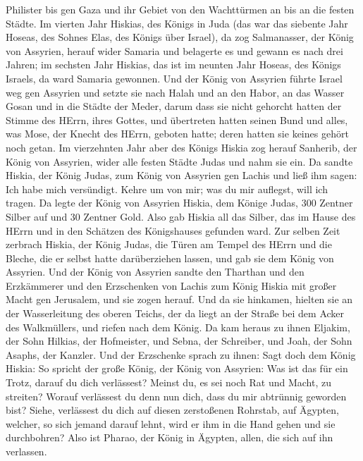 Philister bis gen Gaza und ihr Gebiet von den Wachttürmen an bis an die
festen Städte.  Im vierten Jahr Hiskias, des Königs in Juda
(das war das siebente Jahr Hoseas, des Sohnes Elas, des Königs über
Israel), da zog Salmanasser, der König von Assyrien, herauf wider
Samaria und belagerte es  und gewann es nach drei Jahren;
im sechsten Jahr Hiskias, das ist im neunten Jahr Hoseas, des Königs
Israels, da ward Samaria gewonnen.  Und der König von
Assyrien führte Israel weg gen Assyrien und setzte sie nach Halah und an
den Habor, an das Wasser Gosan und in die Städte der Meder,
 darum dass sie nicht gehorcht hatten der Stimme des HErrn,
ihres Gottes, und übertreten hatten seinen Bund und alles, was Mose, der
Knecht des HErrn, geboten hatte; deren hatten sie keines gehört noch
getan.  Im vierzehnten Jahr aber des Königs Hiskia zog
herauf Sanherib, der König von Assyrien, wider alle festen Städte Judas
und nahm sie ein.  Da sandte Hiskia, der König Judas, zum
König von Assyrien gen Lachis und ließ ihm sagen: Ich habe mich
versündigt. Kehre um von mir; was du mir auflegst, will ich tragen. Da
legte der König von Assyrien Hiskia, dem Könige Judas, 300 Zentner
Silber auf und 30 Zentner Gold.  Also gab Hiskia all das
Silber, das im Hause des HErrn und in den Schätzen des Königshauses
gefunden ward.  Zur selben Zeit zerbrach Hiskia, der König
Judas, die Türen am Tempel des HErrn und die Bleche, die er selbst hatte
darüberziehen lassen, und gab sie dem König von Assyrien. 
Und der König von Assyrien sandte den Tharthan und den Erzkämmerer und
den Erzschenken von Lachis zum König Hiskia mit großer Macht gen
Jerusalem, und sie zogen herauf. Und da sie hinkamen, hielten sie an der
Wasserleitung des oberen Teichs, der da liegt an der Straße bei dem
Acker des Walkmüllers,  und riefen nach dem König. Da kam
heraus zu ihnen Eljakim, der Sohn Hilkias, der Hofmeister, und Sebna,
der Schreiber, und Joah, der Sohn Asaphs, der Kanzler.  Und
der Erzschenke sprach zu ihnen: Sagt doch dem König Hiskia: So spricht
der große König, der König von Assyrien: Was ist das für ein Trotz,
darauf du dich verlässest?  Meinst du, es sei noch Rat und
Macht, zu streiten? Worauf verlässest du denn nun dich, dass du mir
abtrünnig geworden bist?  Siehe, verlässest du dich auf
diesen zerstoßenen Rohrstab, auf Ägypten, welcher, so sich jemand darauf
lehnt, wird er ihm in die Hand gehen und sie durchbohren? Also ist
Pharao, der König in Ägypten, allen, die sich auf ihn verlassen.
